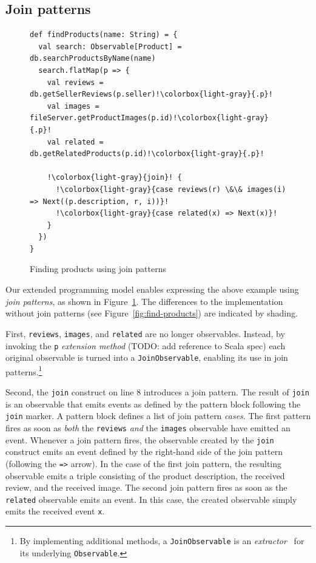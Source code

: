 \documentclass[runningheads]{llncs}
\begin{document}
\begin{sloppypar}
\subsection{Join patterns}


\begin{figure}[ht]
\centering
\lstset{numbers=left}
\begin{lstlisting}[escapechar=!]
def findProducts(name: String) = {
  val search: Observable[Product] = db.searchProductsByName(name)
  search.flatMap(p => {
    val reviews = db.getSellerReviews(p.seller)!\colorbox{light-gray}{.p}!
    val images = fileServer.getProductImages(p.id)!\colorbox{light-gray}{.p}!
    val related = db.getRelatedProducts(p.id)!\colorbox{light-gray}{.p}!

    !\colorbox{light-gray}{join}! {
      !\colorbox{light-gray}{case reviews(r) \&\& images(i) => Next((p.description, r, i))}!
      !\colorbox{light-gray}{case related(x) => Next(x)}!
    }
  })
}
\end{lstlisting}
\caption{Finding products using join patterns}
\label{fig:find-products-joins}
\end{figure}

\noindent
Our extended programming model enables expressing the above example using {\em
join patterns}, as shown in Figure~\ref{fig:find-products-joins}. The
differences to the implementation without join patterns (see
Figure~\ref{fig:find-products}) are indicated by \colorbox{light-gray}{shading}.

First, \verb|reviews|, \verb|images|, and \verb|related| are no longer
observables. Instead, by invoking the \verb|p| {\em extension method} (TODO:
add reference to Scala spec) each original observable is turned into a
\verb|JoinObservable|, enabling its use in join patterns.\footnote{By
implementing additional methods, a \texttt{JoinObservable} is an {\em
extractor}~\cite{EmirOW07} for its underlying \texttt{Observable}.}

Second, the \verb|join| construct on line 8 introduces a join pattern. The
result of \verb|join| is an observable that emits events as defined by the
pattern block following the \verb|join| marker. A pattern block defines a list
of join pattern {\em cases}. The first pattern fires as soon as {\em both} the
\verb|reviews| {\em and} the \verb|images| observable have emitted an event.
Whenever a join pattern fires, the observable created by the \verb|join|
construct emits an event defined by the right-hand side of the join pattern
(following the \verb|=>| arrow). In the case of the first join pattern, the
resulting observable emits a triple consisting of the product description, the
received review, and the received image. The second join pattern fires as soon
as the \verb|related| observable emits an event. In this case, the created
observable simply emits the received event \verb|x|.


\end{sloppypar}
\end{document}
